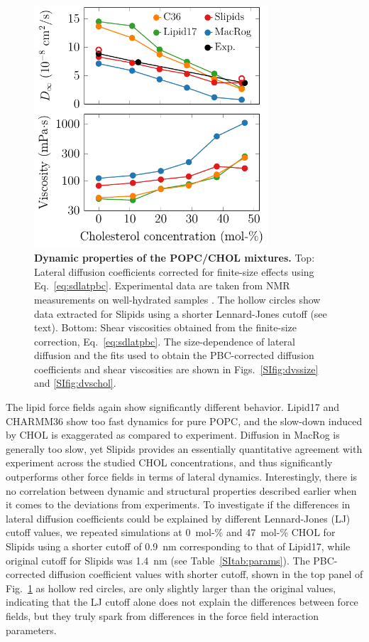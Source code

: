 \documentclass[journal=jctcce]{achemso}
\begin{document}
\begin{figure}[htb!]
  \centering
  \includegraphics[width=8.7cm]{../FIGS/dynamics.pdf}
  \caption{\label{fig:dynamics}%
  \textbf{Dynamic properties of the POPC/CHOL mixtures.}
  Top: Lateral diffusion coefficients corrected for finite-size effects using Eq.~\eqref{eq:sdlatpbc}. Experimental data are taken from NMR measurements on well-hydrated samples \cite{filippov2003influence,filippov2003effect}. The hollow circles show data extracted for Slipids using a shorter Lennard-Jones cutoff (see text).
  Bottom: Shear viscosities obtained from the finite-size correction, Eq.~\eqref{eq:sdlatpbc}.
  The size-dependence of lateral diffusion and the fits used to obtain the PBC-corrected diffusion coefficients and shear viscosities are shown in Figs.~\ref{SIfig:dvssize} and \ref{SIfig:dvschol}.
  }
\end{figure}

The lipid force fields again show significantly different behavior. Lipid17 and CHARMM36 show too fast dynamics for pure POPC, and the slow-down induced by CHOL is exaggerated as compared to experiment. Diffusion in MacRog is generally too slow, yet Slipids provides an essentially quantitative agreement with experiment across the studied CHOL concentrations, and thus significantly outperforms other force fields in terms of lateral dynamics. Interestingly, there is no correlation between dynamic and structural properties described earlier when it comes to the deviations from experiments. To investigate if the differences in lateral diffusion coefficients could be explained by different Lennard-Jones (LJ) cutoff values, we repeated simulations at 0~mol-\% and 47~mol-\% CHOL for Slipids using a shorter cutoff of 0.9~nm corresponding to that of Lipid17, while original cutoff for Slipids was 1.4~nm (see Table~\ref{SItab:params}). The PBC-corrected diffusion coefficient values with shorter cutoff, shown in the top panel of Fig.~\ref{fig:dynamics} as hollow red circles, are only slightly larger than the original values, indicating that the LJ cutoff alone does not explain the differences between force fields, but they truly spark from differences in the force field interaction parameters.
\end{document}

